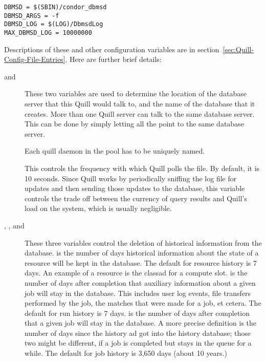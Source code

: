 \begin{verbatim}
DBMSD = $(SBIN)/condor_dbmsd
DBMSD_ARGS = -f
DBMSD_LOG = $(LOG)/DbmsdLog
MAX_DBMSD_LOG = 10000000
\end{verbatim}

Descriptions of these and other configuration variables are in
section~\ref{sec:Quill-Config-File-Entries}.
Here are further brief details:

\begin{description}

\item[ and ]
These two variables are used to determine the location of the database
server that this Quill would talk to, and the name of the database that
it creates.  More than one Quill server can talk to the same database
server.  This can be done by simply letting all the 
 point to the same database server.

\item[]
Each quill daemon in the pool has to be uniquely named.

\item[]
This controls the frequency with which Quill polls the
 file.  By default, it is 10 seconds.  Since Quill
works by periodically sniffing the log file for updates and then sending
those updates to the database, this variable controls the trade off between
the currency of query results and Quill's load on the system, which
is usually negligible.

\item[ , 
		, and
		]
These three variables control the deletion of historical information from the
database. 
 is the number of days
historical information about the state of a resource will be kept in the 
database. 
The default for resource history is 7 days.
An example of a resource is the classad for a compute slot.
 is the number of days
after completion that auxiliary information about a  given job will stay in 
the database.  
This includes user log events, file transfers performed by the job, the matches
that were made for a job, et cetera. 
The default for run history is 7 days.
 is the number of days
after completion that a given job will stay in the database.  
A more precise definition is the number of days since the history ad got 
into the history database; those two might be different,
if a job is completed but stays in the queue for a while.
The default for job history is 3,650 days (about 10 years.)


\end{description}
